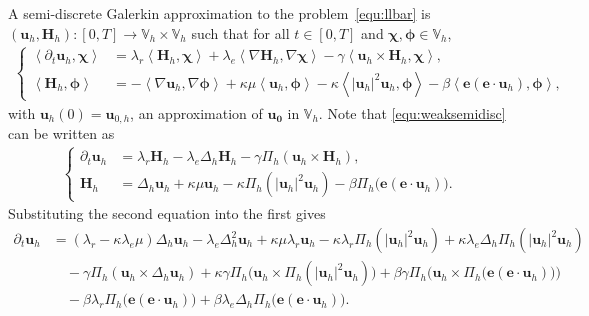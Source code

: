 \documentclass[11pt, reqno]{amsart}
\theoremstyle{definition}
\theoremstyle{remark}
\numberwithin{equation}{section}
\newcommand{\bff}{\boldsymbol}
\newcommand{\bb}{\mathbb}
\newcommand{\inpro}[2]{\left\langle#1,#2\right\rangle}
\begin{document}
A semi-discrete Galerkin approximation to the problem~\eqref{equ:llbar} is $(\bff{u}_h, \bff{H}_h): [0,T] \to \bb{V}_h \times \bb{V}_h$ such that for all $t\in [0,T]$ and $\bff{\chi}, \bff{\phi} \in \bb{V}_h$,
\begin{align}\label{equ:weaksemidisc}
	\left\{
	\begin{alignedat}{1}
	\inpro{ \partial_t \bff{u}_h}{\bff{\chi}}
	&=
	\lambda_r \inpro{\bff{H}_h}{\bff{\chi}}
	+
	\lambda_e \inpro{\nabla \bff{H}_h}{\nabla \bff{\chi}}
	-
	\gamma \inpro{\bff{u}_h \times \bff{H}_h}{\bff{\chi}},
	\\
	\inpro{\bff{H}_h}{\bff{\phi}} 
	&=
	-
	\inpro{\nabla \bff{u}_h}{\nabla \bff{\phi}}
	+
	\kappa \mu \inpro{\bff{u}_h}{\bff{\phi}}
	-
	\kappa \inpro{|\bff{u}_h|^2 \bff{u}_h}{\bff{\phi}}
	-
	\beta \inpro{\bff{e}(\bff{e}\cdot \bff{u}_h)}{\bff{\phi}},
	\end{alignedat}
	\right.
\end{align}
with $\bff{u}_h(0)= \bff{u}_{0,h}$, an approximation of $\bff{u_0}$ in $\bb{V}_h$.
Note that \eqref{equ:weaksemidisc} can be written as
\begin{align}\label{equ:weakproj}
	\left\{
	\begin{alignedat}{1}
		\partial_t \bff{u}_h
		&=
		\lambda_r \bff{H}_h
		-
		\lambda_e \Delta_h \bff{H}_h
		-
		\gamma \Pi_h (\bff{u}_h \times \bff{H}_h),
		\\
		\bff{H}_h 
		&= 
		\Delta_h \bff{u}_h 
		+ 
		\kappa \mu \bff{u}_h 
		- 
		\kappa \Pi_h (|\bff{u}_h|^2 \bff{u}_h)
		-
		\beta \Pi_h \big(\bff{e}(\bff{e}\cdot \bff{u}_h)\big).
	\end{alignedat}
	\right.
\end{align}
Substituting the second equation into the first gives
\begin{align}\label{equ:ode sub}
	\nonumber
	\partial_t \bff{u}_h 
	&=
	(\lambda_r-\kappa\lambda_e \mu) \Delta_h \bff{u}_h
	-
	\lambda_e \Delta_h^2 \bff{u}_h
	+
	\kappa \mu \lambda_r \bff{u}_h
	-
	\kappa\lambda_r \Pi_h (|\bff{u}_h|^2 \bff{u}_h)
	+
	\kappa\lambda_e \Delta_h \Pi_h (|\bff{u}_h|^2 \bff{u}_h)
	\\
	&\quad 
	-
	\gamma \Pi_h (\bff{u}_h \times \Delta_h \bff{u}_h)
	+
	\kappa \gamma \Pi_h \big( \bff{u}_h \times \Pi_h (|\bff{u}_h|^2 \bff{u}_h) \big)
	+
	\beta\gamma \Pi_h \big(\bff{u}_h\times \Pi_h \big(\bff{e}(\bff{e}\cdot \bff{u}_h)\big)\big)
	\nonumber \\
	&\quad
	-
	\beta \lambda_r \Pi_h \big(\bff{e}(\bff{e}\cdot \bff{u}_h)\big)
	+
	\beta\lambda_e \Delta_h \Pi_h \big(\bff{e}(\bff{e}\cdot \bff{u}_h)\big).
\end{align}
\end{document}
